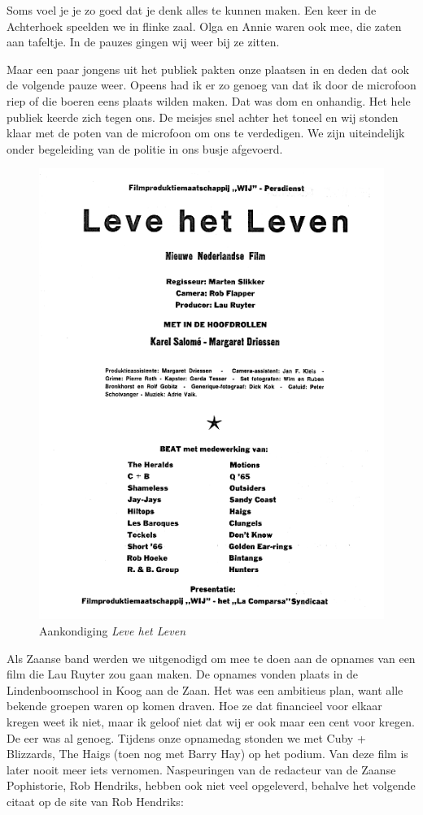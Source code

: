 \documentclass[10pt,twoside, openright]{memoir}
\begin{document}
Soms voel je je zo goed dat je denk alles te kunnen maken. Een keer in de Achterhoek speelden we in flinke zaal. Olga en Annie waren ook mee, die zaten aan tafeltje. In de pauzes gingen wij weer bij ze zitten. 

Maar een paar jongens uit het publiek pakten onze plaatsen in en deden dat ook de volgende pauze weer. Opeens had ik er zo genoeg van dat ik door de microfoon riep of die boeren eens plaats wilden maken. Dat was dom en onhandig. Het hele publiek keerde zich tegen ons. De meisjes snel achter het toneel en wij stonden klaar met de poten van de microfoon om ons te verdedigen. We zijn uiteindelijk onder begeleiding van de politie in ons busje afgevoerd.

\begin{figure}
\includegraphics[width=\textwidth]{img/ch30/film}
\caption*{\footnotesize Aankondiging \emph{Leve het Leven}}
\end{figure}

Als Zaanse band werden we uitgenodigd om mee te doen aan de opnames van een film die Lau Ruyter zou gaan maken. De opnames vonden plaats in de Lindenboomschool in Koog aan de Zaan. Het was een ambitieus plan, want alle bekende groepen waren op komen draven. Hoe ze dat financieel voor elkaar kregen weet ik niet, maar ik geloof niet dat wij er ook maar een cent voor kregen. De eer was al genoeg. Tijdens onze opnamedag stonden we met Cuby + Blizzards, The Haigs (toen nog met Barry Hay) op het podium. Van deze film is later nooit meer iets vernomen. Naspeuringen van de redacteur van de Zaanse Pophistorie, Rob Hendriks, hebben ook niet veel opgeleverd, behalve het volgende citaat op de site van Rob Hendriks: 
\end{document}
